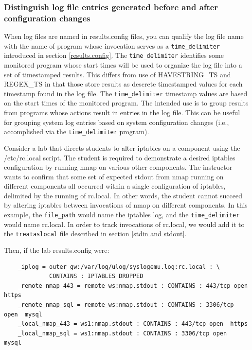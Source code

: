 \documentclass[12pt]{article}
\begin{document}
\subsubsection{Distinguish log file entries generated before and after configuration changes}
\label{time delimeter}
When log files are named in results.config files, you can qualify the log file name
with the name of program whose invocation serves as a {\tt time\_delimiter} introduced
in section \ref{results.config}.
The {\tt time\_delimiter} identifies some
monitored program whose start times will be used to organize the log file into
a set of timestamped results.  This differs from use of HAVESTRING\_TS and
REGEX\_TS in that those store results as descrete timestamped values for each
timestamp found in the log file.  The {\tt time\_delimiter} timestamp values are
based on the start times of the monitored program.  The intended use is to
group results from programs whose actions result in entries in the log file.
This can be useful for grouping system log entries based on system configuration
changes (i.e., accomplished via the {\tt time\_delimiter} program). 

Consider a lab that directs students to alter iptables on a component using the
/etc/rc.local script.  The student is required to demonstrate a desired iptables
configuration by running nmap on various other components.  The instructor wants 
to confirm that some set of expected stdout from nmap running on different
components all occurred within a single
configuration of iptables, delimited by the running of rc.local.  In other words,
the student cannot succeed by altering iptables between invocations of nmap on
different components.  In this example, the {\tt file\_path} would name the iptables
log, and the {\tt time\_delimiter} would name rc.local.  In order to track invocations
of rc.local, we would add it to the {\tt treataslocal} file described in section \ref{stdin and stdout}.

Then, if the lab results.config were:
\begin{verbatim}
    _iplog = outer_gw:/var/log/ulog/syslogemu.log:rc.local : \
             CONTAINS : IPTABLES DROPPED
    _remote_nmap_443 = remote_ws:nmap.stdout : CONTAINS : 443/tcp open  https
    _remote_nmap_sql = remote_ws:nmap.stdout : CONTAINS : 3306/tcp open  mysql
    _local_nmap_443 = ws1:nmap.stdout : CONTAINS : 443/tcp open  https
    _local_nmap_sql = ws1:nmap.stdout : CONTAINS : 3306/tcp open  mysql
\end{verbatim}
\end{document}
